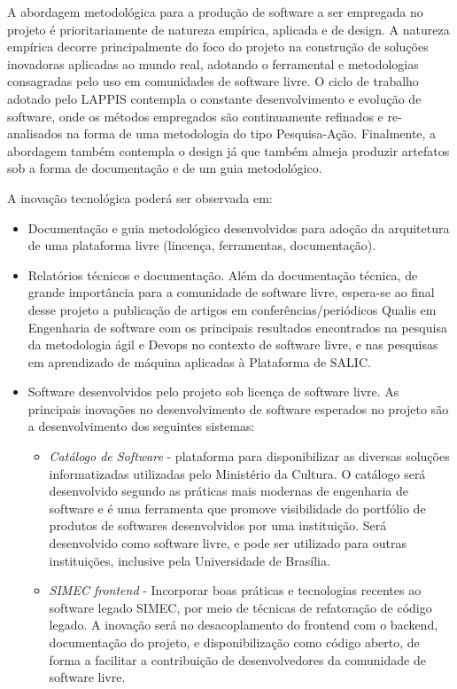 A abordagem metodológica para a produção de software a ser empregada no projeto é prioritariamente de natureza empírica, aplicada e de design.
A natureza empírica decorre principalmente do foco do projeto na construção de soluções inovadoras aplicadas ao mundo real, adotando o ferramental
e metodologias consagradas pelo uso em comunidades de software livre. O ciclo de trabalho adotado pelo LAPPIS contempla o constante desenvolvimento
e evolução de software, onde os métodos empregados são continuamente refinados e re-analisados na forma de uma metodologia do tipo Pesquisa-Ação. 
Finalmente, a abordagem também contempla o design já que também almeja produzir artefatos sob a forma de documentação e de um guia metodológico. 

A inovação tecnológica poderá ser observada em:

\begin{itemize}
 \item Documentação e guia metodológico desenvolvidos 	para adoção da arquitetura de uma plataforma livre (lincença, ferramentas, documentação).
 
 \item Relatórios técnicos e documentação. Além da documentação técnica,  de grande importância para a comunidade de software livre, 
 espera-se ao final desse projeto a publicação de artigos em conferências/periódicos Qualis em Engenharia de software com os principais 
 resultados encontrados na pesquisa da metodologia ágil e Devops no contexto de software livre,
 e nas pesquisas em  aprendizado de máquina aplicadas à Plataforma de SALIC.
 
 \item Software desenvolvidos pelo projeto sob licença de software livre. 
 As principais inovações no desenvolvimento de software esperados no projeto são a desenvolvimento dos seguintes sistemas:
 \begin{itemize}
  \item \textit{Catálogo de Software} - plataforma para disponibilizar as diversas soluções informatizadas utilizadas  pelo Ministério da
 Cultura. O catálogo será desenvolvido segundo as práticas mais modernas de engenharia de software e é uma ferramenta que promove visibilidade
 do portfólio de produtos de softwares desenvolvidos por uma instituição. Será desenvolvido como software livre, 
 e pode ser utilizado para outras instituições, inclusive pela Universidade de Brasília.
  
  \item \textit{SIMEC frontend} - Incorporar boas práticas e tecnologias recentes ao software legado SIMEC, por meio de técnicas de refatoração
  de código legado. A inovação será no desacoplamento do frontend com o backend, documentação do projeto, e disponibilização como código aberto,
  de forma a facilitar a contribuição de desenvolvedores da comunidade de software livre. 


\end{itemize}
\end{itemize}
